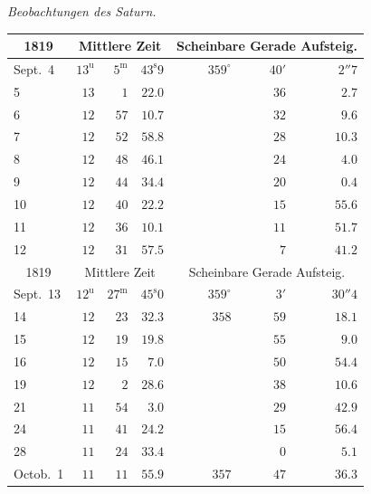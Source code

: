 \begin{center}
\emph{Beobachtungen des Saturn.}

\small
\setlength{\tabcolsep}{5pt}
\begin{tabular}{l|rrr|rrr}
\multicolumn{1}{c|}{1819}  &  \multicolumn{3}{c|}{Mittlere Zeit}  &  \multicolumn{3}{c}{Scheinbare Gerade Aufsteig.}  \\
\hline
Sept.\ 4  &  $13^{\mathrm u}$  &  $5^{\mathrm m}$  &  $43^{\mathrm s}9$  &  $359^\circ$  &  $40'$  &  $2''7$  \\
5  &  $13$  &  $1$  &  $22.0$  &   &  $36$  &  $2.7$  \\
6  &  $12$  &  $57$  &  $10.7$  &   &  $32$  &  $9.6$  \\
7  &  $12$  &  $52$  &  $58.8$  &   &  $28$  &  $10.3$  \\
8  &  $12$  &  $48$  &  $46.1$  &   &  $24$  &  $4.0$  \\
9  &  $12$  &  $44$  &  $34.4$  &   &  $20$  &  $0.4$  \\
10  &  $12$  &  $40$  &  $22.2$  &   &  $15$  &  $55.6$  \\
11  &  $12$  &  $36$  &  $10.1$  &   &  $11$  &  $51.7$  \\
12  &  $12$  &  $31$  &  $57.5$  &   &  $7$  &  $41.2$  \\
\hline
 \multicolumn{1}{c|}{1819}  &  \multicolumn{3}{c|}{Mittlere Zeit}  &  \multicolumn{3}{c}{Scheinbare Gerade Aufsteig.}  \\
\hline
 Sept.\ 13  &  $12^{\mathrm u}$  &  $27^{\mathrm m}$  &  $45^{\mathrm s}0$  &  $359^\circ$  &  $3'$  &  $30''4$  \\
 14  &  $12$  &  $23$  &  $32.3$  &  $358$  &  $59$  &  $18.1$  \\
 15  &  $12$  &  $19$  &  $19.8$  &   &  $55$  &  $9.0$  \\
 16  &  $12$  &  $15$  &  $7.0$  &   &  $50$  &  $54.4$  \\
 19  &  $12$  &  $2$  &  $28.6$  &   &  $38$  &  $10.6$  \\
 21  &  $11$  &  $54$  &  $3.0$  &   &  $29$  &  $42.9$  \\
 24  &  $11$  &  $41$  &  $24.2$  &   &  $15$  &  $56.4$  \\
 28  &  $11$  &  $24$  &  $33.4$  &   &  $0$  &  $5.1$  \\
 Octob.\ 1  &  $11$  &  $11$  &  $55.9$  &  $357$  &  $47$  &  $36.3$  \\
\end{tabular}
\end{center}

